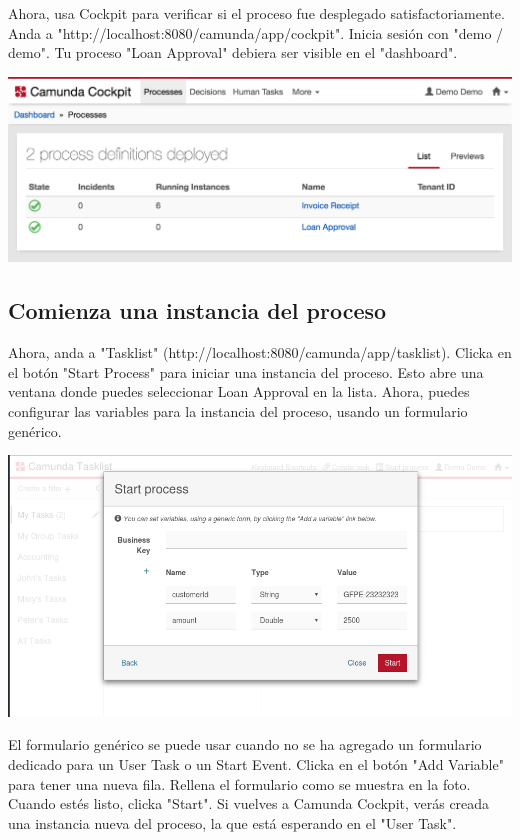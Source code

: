 \documentclass{article}
\begin{document}
Ahora, usa Cockpit para verificar si el proceso fue desplegado satisfactoriamente. Anda a "http://localhost:8080/camunda/app/cockpit". Inicia sesión con "demo / demo". Tu proceso "Loan Approval" debiera ser visible en el "dashboard".

\begin{center}
\includegraphics[width=\textwidth]{cockpit-loan-approval.png}
\end{center}

\subsection{Comienza una instancia del proceso}

Ahora, anda a "Tasklist" (http://localhost:8080/camunda/app/tasklist). Clicka en el botón "Start Process" para iniciar una instancia del proceso. Esto abre una ventana donde puedes seleccionar Loan Approval en la lista. Ahora, puedes configurar las variables para la instancia del proceso, usando un formulario genérico.

\begin{center}
\includegraphics[width=\textwidth]{start-form-generic.png}
\end{center}

El formulario genérico se puede usar cuando no se ha agregado un formulario dedicado para un User Task o un Start Event. Clicka en el botón "Add Variable" para tener una nueva fila. Rellena el formulario como se muestra en la foto. Cuando estés listo, clicka "Start".
Si vuelves a Camunda Cockpit, verás creada una instancia nueva del proceso, la que está esperando en el "User Task".
\end{document}
